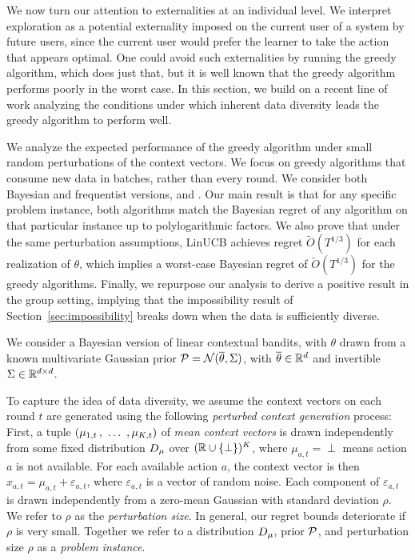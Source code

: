 We now turn our attention to externalities at an individual level. We interpret exploration as a potential externality imposed on the current user of a system by future users, since the current user would prefer the learner to take the action that appears optimal.  One could avoid such externalities by running the greedy algorithm, which does just that, but it is well known that the greedy algorithm performs poorly in the worst case.  In this section, we build on a recent line of work analyzing the conditions under which inherent data diversity leads the greedy algorithm to perform well.

We analyze the expected performance of the greedy algorithm under small random perturbations of the context vectors. We focus on greedy algorithms that consume new data in batches, rather than every round. We consider both Bayesian and frequentist versions, \bg and \fg. Our main result is that for any specific problem instance, both algorithms match the Bayesian regret of any algorithm on that particular instance up to polylogarithmic factors. We also prove that under the same perturbation assumptions, LinUCB achieves regret $\tilde{O}(T^{1/3})$ for each realization of $\theta$, which implies a worst-case Bayesian regret of $\tilde{O}(T^{1/3})$ for the greedy algorithms. Finally, we repurpose our analysis to derive a positive result in the group setting, implying that the impossibility result of Section~\ref{sec:impossibility} breaks down when the data is sufficiently diverse.

We consider a Bayesian version of linear contextual bandits, with 
$\theta$ drawn from a known
multivariate Gaussian prior
    $\mathcal{P} = \mathcal{N}(\overline \theta, \Sigma)$,
with $\overline \theta \in \mathbb{R}^d$ and invertible $\Sigma \in \mathbb{R}^{d\times d}$.


To capture the idea of data diversity, we assume the context vectors on each round $t$ are generated using the following \emph{perturbed context generation} process:  First, a tuple $(\mu_{1,t} \, ,\ \ldots\ , \mu_{K,t} )$ of \emph{mean context vectors} is drawn independently from some fixed distribution $D_\mu$ over $(\mathbb{R}\cup \{\perp\})^K$, where $\mu_{a, t} = \perp$ means action $a$ is not available. For each available action $a$, the context vector is then $x_{a,t} = \mu_{a,t} + \varepsilon_{a, t}$, where $\varepsilon_{a, t}$ is a vector of random noise. Each component of
    $\varepsilon_{a, t}$
is drawn independently from a zero-mean Gaussian with standard deviation $\rho$.
We refer to $\rho$ as the \emph{perturbation size}. In general, our regret bounds deteriorate if $\rho$ is very small.
Together we refer to a distribution $D_\mu$, prior $\mathcal{P}$, and perturbation size $\rho$ as a \textit{problem instance}.

